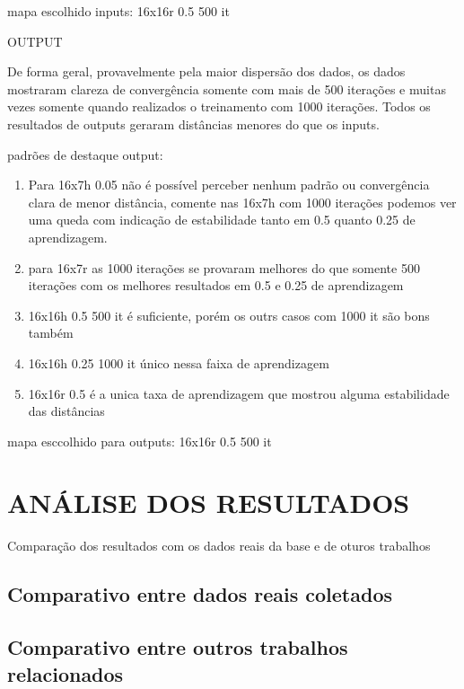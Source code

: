 mapa escolhido inputs: 16x16r 0.5 500 it

OUTPUT

De forma geral, provavelmente pela maior dispersão dos dados, os dados mostraram clareza de convergência somente com mais de 500 iterações e muitas vezes somente quando realizados o treinamento com 1000 iterações. Todos os resultados de outputs geraram distâncias menores do que os inputs.

padrões de destaque output:
\begin{enumerate}
	\item Para 16x7h 0.05 não é possível perceber nenhum padrão ou convergência clara de menor distância, comente nas 16x7h com 1000 iterações podemos ver uma queda com indicação de estabilidade tanto em 0.5 quanto 0.25 de aprendizagem.
	\item para 16x7r as 1000 iterações se provaram melhores do que somente 500 iterações com os melhores resultados em 0.5 e 0.25 de aprendizagem
	\item 16x16h 0.5 500 it é suficiente, porém os outrs casos com 1000 it são bons também
	\item 16x16h 0.25 1000 it único nessa faixa de aprendizagem
	\item 16x16r 0.5 é a unica taxa de aprendizagem que mostrou alguma estabilidade das distâncias
\end{enumerate}

mapa esccolhido para outputs: 16x16r 0.5 500 it

\section{ANÁLISE DOS RESULTADOS}
\label{sec:analiseResultados}
Comparação dos resultados com os dados reais da base e de oturos trabalhos

\subsection{Comparativo entre dados reais coletados}
\label{subesction:compDadosReais}

\subsection{Comparativo entre outros trabalhos relacionados}
\label{subsection:compOutrosTrabalhos}